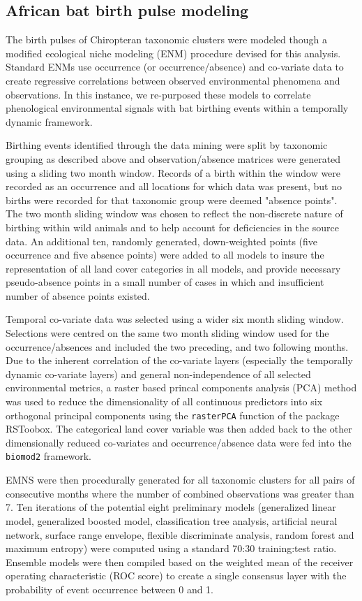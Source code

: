 \documentclass[9pt,twoside,lineno]{pnas-new}
\begin{document}
\subsection*{African bat birth pulse modeling}
\label{biomod}
The birth pulses of Chiropteran taxonomic clusters were modeled though a modified ecological niche modeling (ENM) procedure devised for this analysis. Standard ENMs use occurrence (or occurrence/absence) and co-variate data to create regressive correlations between observed environmental phenomena and observations. In this instance, we re-purposed these models to correlate phenological environmental signals with bat birthing events within a temporally dynamic framework.\par
Birthing events identified through the data mining were split by taxonomic grouping as described above and observation/absence matrices were generated using a sliding two month window. Records of a birth within the window were recorded as an occurrence and all locations for which data was present, but no births were recorded for that taxonomic group were deemed "absence points". The two month sliding window was chosen to reflect the non-discrete nature of birthing within wild animals and to help account for deficiencies in the source data. An additional ten, randomly generated, down-weighted points (five occurrence and five absence points) were added to all models to insure the representation of all land cover categories in all models, and provide necessary pseudo-absence points in a small number of cases in which and insufficient number of absence points existed.\par
Temporal co-variate data was selected using a wider six month sliding window. Selections were centred on the same two month sliding window used for the occurrence/absences and included the two preceding, and two following months. Due to the inherent correlation of the co-variate layers (especially the temporally dynamic co-variate layers) and general non-independence of all selected environmental metrics, a raster based princal components analysis (PCA) method was used to reduce the dimensionality of all continuous predictors into six orthogonal principal components using the \texttt{rasterPCA} function of the package RSToobox. The categorical land cover variable was then added back to the other dimensionally reduced co-variates and occurrence/absence data were fed into the \texttt{biomod2}\cite{Thuiller2017Biomod2:Modeling} framework.\par
EMNS were then procedurally generated for all taxonomic clusters for all pairs of consecutive months where the number of combined observations was greater than 7. Ten iterations of the potential eight preliminary models (generalized linear model, generalized boosted model, classification tree analysis, artificial neural network, surface range envelope, flexible discriminate analysis, random forest and maximum entropy) were computed using a standard 70:30 training:test ratio. Ensemble models were then compiled based on the weighted mean of the receiver operating characteristic (ROC score) to create a single consensus layer with the probability of event occurrence between 0 and 1.\par
\end{document}
